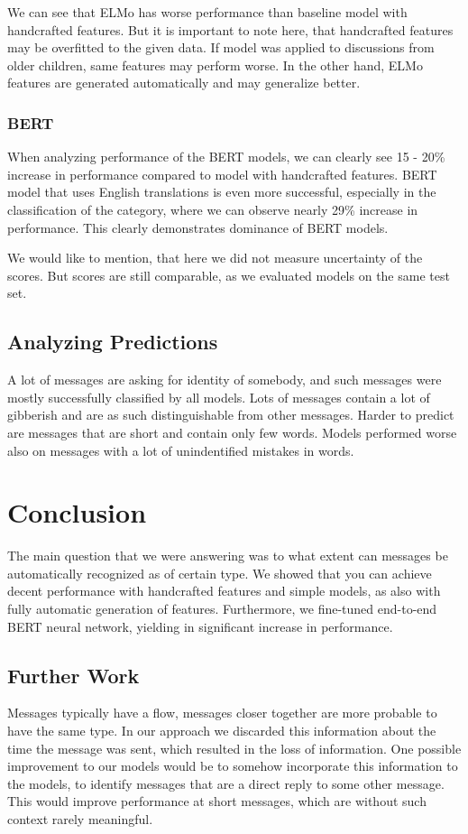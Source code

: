 \documentclass[11pt,a4paper]{article}
\begin{document}
We can see that ELMo has worse performance than baseline model with handcrafted features. But it is important to note here, that handcrafted features may be overfitted to the given data. If model was applied to discussions from older children, same features may perform worse. In the other hand, ELMo features are generated automatically and may generalize better.

\subsubsection{BERT}
When analyzing performance of the BERT models, we can clearly see 15 - 20\% increase in performance compared to model with handcrafted features. BERT model that uses English translations is even more successful, especially in the classification of the category, where we can observe nearly 29\% increase in performance. This clearly demonstrates dominance of BERT models.

We would like to mention, that here we did not measure uncertainty of the scores. But scores are still comparable, as we evaluated models on the same test set.
 
\subsection{Analyzing Predictions}
A lot of messages are asking for identity of somebody, and such messages were mostly successfully classified by all models. Lots of messages contain a lot of gibberish and are as such distinguishable from other messages. Harder to predict are messages that are short and contain only few words. Models performed worse also on messages with a lot of unindentified mistakes in words. 

\section{Conclusion}
The main question that we were answering was to what extent can messages be automatically recognized as of certain type. We showed that you can achieve decent performance with handcrafted features and simple models, as also with fully automatic generation of features. Furthermore, we fine-tuned end-to-end BERT neural network, yielding in significant increase in performance.

\subsection{Further Work}
Messages typically have a flow, messages closer together are more probable to have the same type. In our approach we discarded this information about the time the message was sent, which resulted in the loss of information. One possible improvement to our models would be to somehow incorporate this information to the models, to identify messages that are a direct reply to some other message. This would improve performance at short messages, which are without such context rarely meaningful.

 



\end{document}
